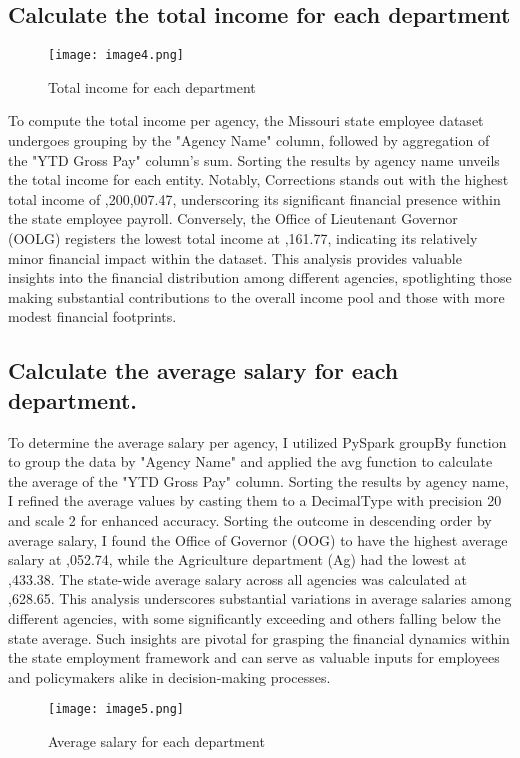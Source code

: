 \documentclass{article}
\begin{document}
\subsection{Calculate the total income for each department}
\begin{figure}[h!]
    \centering
    \texttt{[image: image4.png]}
    \caption{Total income for each department}
    \label{fig:enter-label}
\end{figure}

To compute the total income per agency, the Missouri state employee dataset undergoes grouping by the "Agency Name" column, followed by aggregation of the "YTD Gross Pay" column's sum. Sorting the results by agency name unveils the total income for each entity. Notably, Corrections stands out with the highest total income of ,200,007.47, underscoring its significant financial presence within the state employee payroll. Conversely, the Office of Lieutenant Governor (OOLG) registers the lowest total income at ,161.77, indicating its relatively minor financial impact within the dataset. This analysis provides valuable insights into the financial distribution among different agencies, spotlighting those making substantial contributions to the overall income pool and those with more modest financial footprints.



\subsection{Calculate the average salary for each department.}

To determine the average salary per agency, I utilized PySpark groupBy function to group the data by "Agency Name" and applied the avg function to calculate the average of the "YTD Gross Pay" column. Sorting the results by agency name, I refined the average values by casting them to a DecimalType with precision 20 and scale 2 for enhanced accuracy. Sorting the outcome in descending order by average salary, I found the Office of Governor (OOG) to have the highest average salary at ,052.74, while the Agriculture department (Ag) had the lowest at ,433.38. The state-wide average salary across all agencies was calculated at ,628.65. This analysis underscores substantial variations in average salaries among different agencies, with some significantly exceeding and others falling below the state average. Such insights are pivotal for grasping the financial dynamics within the state employment framework and can serve as valuable inputs for employees and policymakers alike in decision-making processes.
\begin{figure}[h!]
    \centering
    \texttt{[image: image5.png]}
    \caption{Average salary for each department}
    \label{fig:enter-label}
\end{figure}
\end{document}
